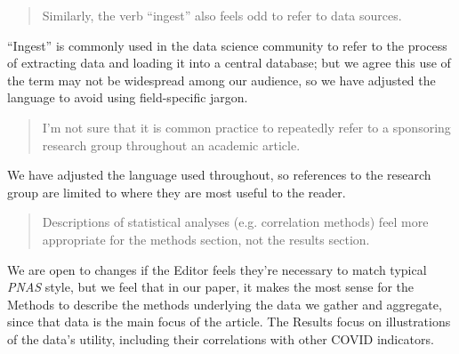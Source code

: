 \documentclass[11pt]{article}
\begin{document}
\begin{quote}
  Similarly, the verb ``ingest'' also feels odd to refer to data sources.
\end{quote}
``Ingest'' is commonly used in the data science community to refer to the
process of extracting data and loading it into a central database; but we agree
this use of the term may not be widespread among our audience, so we have
adjusted the language to avoid using field-specific jargon.

\begin{quote}
  I'm not sure that it is common practice to repeatedly refer to a sponsoring
  research group throughout an academic article.
\end{quote}
We have adjusted the language used throughout, so references to the research
group are limited to where they are most useful to the reader.

\begin{quote}
  Descriptions of statistical analyses (e.g. correlation methods) feel more
  appropriate for the methods section, not the results section.
\end{quote}
We are open to changes if the Editor feels they're necessary to match typical
\textit{PNAS} style, but we feel that in our paper, it makes the most sense for
the Methods to describe the methods underlying the data we gather and aggregate,
since that data is the main focus of the article. The Results focus on
illustrations of the data's utility, including their correlations with other
COVID indicators.
\end{document}
